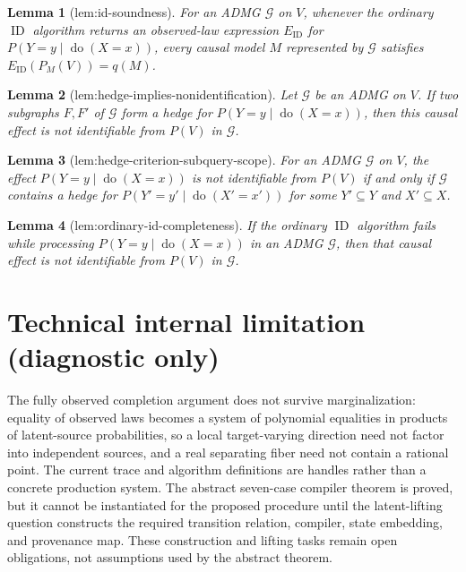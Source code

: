 \documentclass{article}
\newtheorem{lemma}{Lemma}
\begin{document}
\begin{lemma}[lem:id-soundness]\label{lem:id-soundness}
For an ADMG \(\mathcal G\) on \(V\), whenever the ordinary \(\operatorname{ID}\) algorithm returns an observed-law expression \(E_{\mathrm{ID}}\) for \(P(Y=y\mid\operatorname{do}(X=x))\), every causal model \(M\) represented by \(\mathcal G\) satisfies \(E_{\mathrm{ID}}(P_M(V))=q(M)\).
\end{lemma}

\begin{lemma}[lem:hedge-implies-nonidentification]\label{lem:hedge-implies-nonidentification}
Let \(\mathcal G\) be an ADMG on \(V\). If two subgraphs \(F,F'\) of \(\mathcal G\) form a hedge for \(P(Y=y\mid\operatorname{do}(X=x))\), then this causal effect is not identifiable from \(P(V)\) in \(\mathcal G\).
\end{lemma}

\begin{lemma}[lem:hedge-criterion-subquery-scope]\label{lem:hedge-criterion-subquery-scope}
For an ADMG \(\mathcal G\) on \(V\), the effect \(P(Y=y\mid\operatorname{do}(X=x))\) is not identifiable from \(P(V)\) if and only if \(\mathcal G\) contains a hedge for \(P(Y'=y'\mid\operatorname{do}(X'=x'))\) for some \(Y'\subseteq Y\) and \(X'\subseteq X\).
\end{lemma}

\begin{lemma}[lem:ordinary-id-completeness]\label{lem:ordinary-id-completeness}
If the ordinary \(\operatorname{ID}\) algorithm fails while processing \(P(Y=y\mid\operatorname{do}(X=x))\) in an ADMG \(\mathcal G\), then that causal effect is not identifiable from \(P(V)\) in \(\mathcal G\).
\end{lemma}

\section*{Technical internal limitation (diagnostic only)}

The fully observed completion argument does not survive marginalization: equality of observed laws becomes a system of polynomial equalities in products of latent-source probabilities, so a local target-varying direction need not factor into independent sources, and a real separating fiber need not contain a rational point. The current trace and algorithm definitions are handles rather than a concrete production system. The abstract seven-case compiler theorem is proved, but it cannot be instantiated for the proposed procedure until the latent-lifting question constructs the required transition relation, compiler, state embedding, and provenance map. These construction and lifting tasks remain open obligations, not assumptions used by the abstract theorem.
\end{document}

